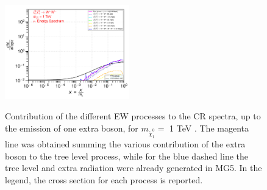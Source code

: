 \documentclass[epj,nopacs,fleqn]{svjour}
\begin{document}
\begin{figure}[!h]
	\subfigure
	{\includegraphics[width=0.48\textwidth]{Fig/n1ww_comparison/1000_neutrinos_tau_n1ww_comparison.pdf} }
	
	\caption{Contribution of the different EW processes to the CR spectra, up to the emission of one extra boson, for $m_{\tilde \chi_1 ^0}=$ 1 TeV . The magenta line was obtained summing the various contribution of the extra boson to the tree level process, while for the blue dashed line the tree level and extra radiation were already generated in MG5. In the legend, the cross section for each process is reported.}
	\label{ew_comparison_1}
\end{figure}
\end{document}
